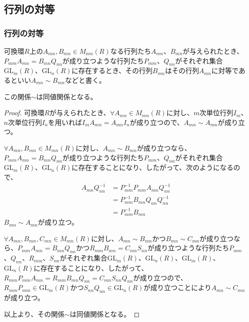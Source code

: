 \documentclass[dvipdfmx]{jsarticle}
\begin{document}
\subsection{行列の対等}%
\subsubsection{行列の対等}%
\begin{dfn}
可換環$R$上の$A_{mn},B_{mn} \in M_{mn}(R)$なる行列たち$A_{mn}$、$B_{mn}$が与えられたとき、$P_{mm}A_{mn} = B_{mn}Q_{nn}$が成り立つような行列たち$P_{mm}$、$Q_{nn}$がそれぞれ集合${\mathrm{GL}}_{m}(R)$、${\mathrm{GL}}_{n}(R)$に存在するとき、その行列$B_{mn}$はその行列$A_{mn}$に対等であるといい$A_{mn} \sim B_{mn}$などと書く。
\end{dfn}
\begin{thm}\label{2.1.6.1}
この関係$\sim$は同値関係となる。
\end{thm}
\begin{proof}
可換環$R$が与えられたとき、$\forall A_{mn} \in M_{mn}(R)$に対し、$m$次単位行列$I_{m}$、$n$次単位行列$I_{n}$を用いれば$I_{m}A_{mn} = A_{mn}I_{n}$が成り立つので、$A_{mn} \sim A_{mn}$が成り立つ。\par
$\forall A_{mn},B_{mn} \in M_{mn}(R)$に対し、$A_{mn} \sim B_{mn}$が成り立つなら、$P_{mm}A_{mn} = B_{mn}Q_{nn}$が成り立つような行列たち$P_{mm}$、$Q_{nn}$がそれぞれ集合${\mathrm{GL}}_{m}(R)$、${\mathrm{GL}}_{n}(R)$に存在することになり、したがって、次のようになるので、
\begin{align*}
A_{mn}Q_{nn}^{- 1} &= P_{mm}^{- 1}P_{mm}A_{mn}Q_{nn}^{- 1}\\
&= P_{mm}^{- 1}B_{mn}Q_{nn}Q_{nn}^{- 1}\\
&= P_{mm}^{- 1}B_{mn}
\end{align*}
$B_{mn} \sim A_{mn}$が成り立つ。\par
$\forall A_{mn},B_{mn},C_{mn} \in M_{mn}(R)$に対し、$A_{mn} \sim B_{mn}$かつ$B_{mn} \sim C_{mn}$が成り立つなら、$P_{mm}A_{mn} = B_{mn}Q_{nn}$かつ$R_{mm}B_{mn} = C_{mn}S_{nn}$が成り立つような行列たち$P_{mm}$、$Q_{nn}$、$R_{mm}$、$S_{nn}$がそれぞれ集合${\mathrm{GL}}_{m}(R)$、${\mathrm{GL}}_{n}(R)$、${\mathrm{GL}}_{m}(R)$、${\mathrm{GL}}_{n}(R)$に存在することになり、したがって、$R_{mm}P_{mm}A_{mn} = R_{mm}B_{mn}Q_{nn} = C_{mn}S_{nn}Q_{nn}$が成り立つので、$R_{mm}P_{mm} \in {\mathrm{GL}}_{m}(R)$かつ$S_{nn}Q_{nn} \in {\mathrm{GL}}_{n}(R)$が成り立つことにより$A_{mn} \sim C_{mn}$が成り立つ。\par
以上より、その関係$\sim$は同値関係となる。
\end{proof}
\end{document}
